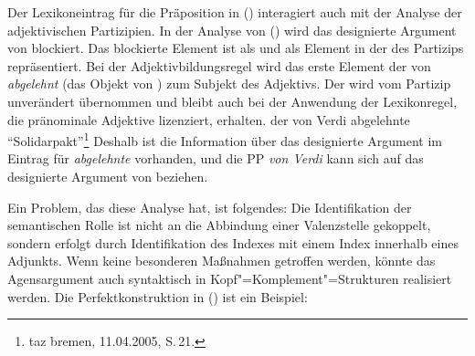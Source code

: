 {Der Lexikoneintrag für die Präposition in () interagiert auch mit der Analyse der adjektivischen Partizipien.
In der Analyse von () wird das designierte Argument von  blockiert. Das blockierte
Element ist als \subjw und als Element in der \daliste des Partizips repräsentiert. Bei der Adjektivbildungsregel
wird das erste Element der \argstl von \emph{abgelehnt} (das Objekt von ) zum Subjekt
des Adjektivs. Der \daw wird vom Partizip unverändert übernommen und bleibt auch bei der Anwendung
der Lexikonregel, die pränominale Adjektive lizenziert, erhalten.
\ea
der von Verdi abgelehnte "`Solidarpakt"'\footnote{
  taz bremen, 11.04.2005, S.\,21.%
}
\z
Deshalb ist die Information über das designierte Argument im Eintrag für \emph{abgelehnte} vorhanden,
und die PP \emph{von Verdi} kann sich auf das designierte Argument von  beziehen.

Ein Problem, das diese Analyse hat, ist folgendes: Die Identifikation der semantischen Rolle
ist nicht an die Abbindung einer Valenzstelle gekoppelt, sondern erfolgt durch Identifikation
des Indexes mit einem Index innerhalb eines Adjunkts. Wenn keine besonderen Maßnahmen getroffen
werden, könnte das Agensargument auch syntaktisch in Kopf"=Komplement"=Strukturen realisiert werden.
Die Perfektkonstruktion in () ist ein Beispiel: 

}
